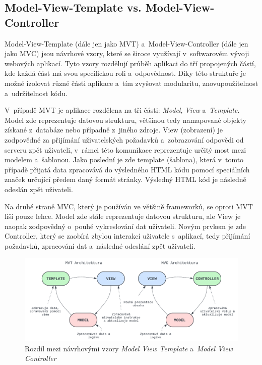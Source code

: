 \subsection*{Model-View-Template vs. Model-View-Controller}
Model-View-Template (dále jen jako MVT) a~Model-View-Controller (dále jen jako MVC) jsou návrhové vzory, které se široce využívají v~softwarovém vývoji webových aplikací. Tyto vzory rozdělují průběh aplikaci do tří propojených částí, kde každá část má svou specifickou roli a~odpovědnost. Díky této struktuře je možné izolovat různé části aplikace a~tím zvyšovat modularitu, znovupoužitelnost a~udržitelnost kódu.

V~případě MVT je aplikace rozdělena na tři části: \textit{Model}, \textit{View} a~\textit{Template}. Model zde reprezentuje datovou strukturu, většinou tedy namapované objekty získané z~databáze nebo případně z~jiného zdroje. View (zobrazení) je zodpovědné za přijímání uživatelských požadavků a~zobrazování odpovědi od serveru zpět uživateli, v~rámci této komunikace reprezentuje určitý most mezi modelem a~šablonou. Jako poslední je zde template (šablona), která v~tomto případě přijatá data zpracovává do výsledného HTML kódu pomocí speciálních značek určující předem daný formát stránky. Výsledný HTML kód je následně odeslán zpět uživateli.

Na druhé straně MVC, který je používán ve většině frameworků, se oproti MVT liší pouze lehce. Model zde stále reprezentuje datovou strukturu, ale View je naopak zodpovědný o~pouhé vykreslování dat uživateli. Novým prvkem je zde Controller, který se zaobírá zbylou interakcí uživatele s~aplikací, tedy přijímání požadavků, zpracování dat a~následné odeslání zpět uživateli. \cite{mvc_mvt_difference}

\begin{figure}[H]
    \centering
    \includegraphics[width=1.0\textwidth]{diagrams/MVC_MVT_Architecture}
    \caption{Rozdíl mezi návrhovými vzory \textit{Model View Template} a~\textit{Model View Controller} \cite{mvc_mvt_difference_img}}
    \label{fig:mvc_mvt_difference}
\end{figure}


